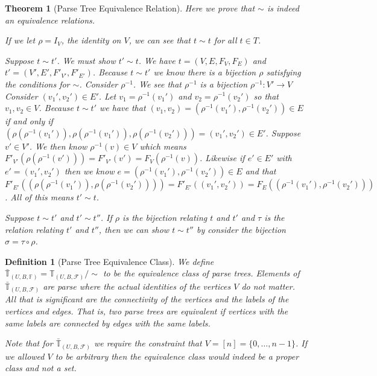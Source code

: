\documentclass[12pt]{article}
\theoremstyle{break}
\newtheorem{definition}{Definition}[section]
\theoremstyle{break}
\newtheorem{theorem}{Theorem}[section]
\theoremstyle{break}
\theoremstyle{break}
\theoremstyle{break}
\newtheorem{informal definition}[definition]{Informal Definition}
\begin{document}
\begin{theorem}[Parse Tree Equivalence Relation]
Here we prove that $\sim$ is indeed an equivalence relations.

If we let $\rho = I_V$, the identity on $V$, we can see that $t\sim t$ for all $t\in T$.

Suppose $t \sim t'$.
We must show $t' \sim t$.
We have $t = (V, E, F_V, F_E)$ and $t' = (V', E', F'_{V'}, F'_{E'})$.
Because $t \sim t'$ we know there is a bijection $\rho$ satisfying the conditions for $\sim$.
Consider $\rho^{-1}$.
We see that $\rho^{-1}$ is a bijection $\rho^{-1}:V'\to V$
Consider $(v_1', v_2') \in E'$.
Let $v_1 = \rho^{-1}(v_1')$ and $v_2 = \rho^{-1}(v_2')$ so that $v_1, v_2 \in V$.
Because $t \sim t'$ we have that $(v_1, v_2) = (\rho^{-1}(v_1'), \rho^{-1}(v_2')) \in E$ if and only if $(\rho(\rho^{-1}(v_1')), \rho(\rho^{-1}(v_1')), \rho(\rho^{-1}(v_2'))) = (v_1', v_2') \in E'$.
Suppose $v' \in V'$.
We then know $\rho^{-1}(v) \in V$ which means $F'_{V'}(\rho(\rho^{-1}(v'))) = F'_{V'}(v') = F_V(\rho^{-1}(v))$.
Likewise if $e' \in E'$ with $e' = (v_1', v_2')$ then we know $e = (\rho^{-1}(v_1'), \rho^{-1}(v_2')) \in E$ and that $F'_{E'}((\rho(\rho^{-1}(v_1')), \rho(\rho^{-1}(v_2')))) = F'_{E'}((v_1' ,v_2')) = F_E((\rho^{-1}(v_1'), \rho^{-1}(v_2')))$.
All of this means $t' \sim t$.

Suppose $t \sim t'$ and $t' \sim t''$.
If $\rho$ is the bijection relating $t$ and $t'$ and $\tau$ is the relation relating $t'$ and $t''$, then we can show $t \sim t''$ by consider the bijection $\sigma = \tau \circ \rho$.

\end{theorem}

\begin{definition}[Parse Tree Equivalence Class]
We define $\bar{\mathbb{T}}_{(U, B, \mathbb{F})} = \mathbb{T}_{(U, B, \mathcal{F})} / \sim$ to be the equivalence class of parse trees.
Elements of $\bar{\mathbb{T}}_{(U, B, \mathcal{F})}$ are parse where the actual identities of the vertices $V$ do not matter.
All that is significant are the connectivity of the vertices and the labels of the vertices and edges.
That is, two parse trees are equivalent if vertices with the same labels are connected by edges with the same labels.

Note that for $\bar{\mathbb{T}}_{(U, B, \mathcal{F})}$ we require the constraint that $V = [n] = \{0, \ldots, n-1\}$.
If we allowed $V$ to be arbitrary then the equivalence class would indeed be a proper class and not a set.
\end{definition}
\end{document}
